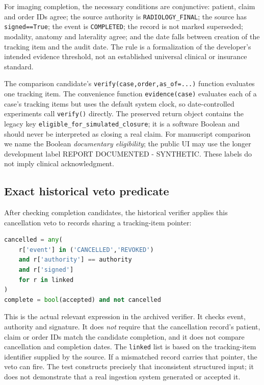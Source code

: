 \documentclass[11pt,twocolumn]{article}
\newcommand{\code}[1]{\texttt{#1}}
\newcommand{\stage}[1]{\textsf{#1}}
\begin{document}
For imaging completion, the necessary conditions are conjunctive: patient, claim and order IDs agree; the source authority is \code{RADIOLOGY\_FINAL}; the source has \code{signed==True}; the event is \code{COMPLETED}; the record is not marked superseded; modality, anatomy and laterality agree; and the date falls between creation of the tracking item and the audit date. The rule is a formalization of the developer's intended evidence threshold, not an established universal clinical or insurance standard.

The comparison candidate's \code{verify(case,order,as\_of=...)} function evaluates one tracking item. The convenience function \code{evidence(case)} evaluates each of a case's tracking items but uses the default system clock, so date-controlled experiments call \code{verify()} directly. The preserved return object contains the legacy key \code{eligible\_for\_simulated\_closure}; it is a software Boolean and should never be interpreted as closing a real claim. For manuscript comparison we name the Boolean \emph{documentary eligibility}; the public UI may use the longer development label \stage{REPORT \mbox{DOCUMENTED} - SYNTHETIC}. These labels do not imply clinical acknowledgment.

\subsection{Exact historical veto predicate}
After checking completion candidates, the historical verifier applies this cancellation veto to records sharing a tracking-item pointer:
\begin{lstlisting}[language=Python,columns=fixed,basewidth=0.59em,keepspaces=true]
cancelled = any(
    r['event'] in ('CANCELLED','REVOKED')
    and r['authority'] == authority
    and r['signed']
    for r in linked
)
complete = bool(accepted) and not cancelled
\end{lstlisting}
This is the actual relevant expression in the archived verifier. It checks event, authority and signature. It does \emph{not} require that the cancellation record's patient, claim or order IDs match the candidate completion, and it does not compare cancellation and completion dates. The \code{linked} list is based on the tracking-item identifier supplied by the source. If a mismatched record carries that pointer, the veto can fire. The test constructs precisely that inconsistent structured input; it does not demonstrate that a real ingestion system generated or accepted it.
\end{document}
